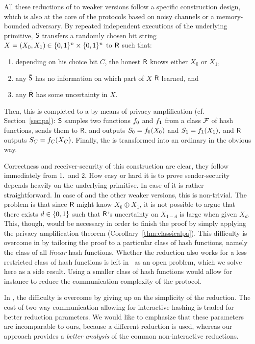 All these reductions of \OT to weaker versions follow a specific
construction design, which is also at the core of the \OT protocols
based on noisy channels or a memory-bounded adversary. By repeated
independent executions of the underlying primitive, $\S$ transfers a
randomly chosen bit string $X = (X_0,X_1) \in \set{0,1}^n \times
\set{0,1}^n$ to $\R$ such that: 
\vspace{-3mm}
\begin{enumerate} \addtolength{\itemsep}{-3mm} 
\item depending on his choice bit $C$, the honest $\R$ knows either
  $X_0$ or $X_1$,
\item any $\dS$ has no information on which part of $X$ $\R$ learned,
  and 
\item any $\dR$ has some uncertainty in $X$. 
\end{enumerate}

Then, this is completed to a \RandOT by means of privacy
amplification (cf. Section~\ref{sec:pa}): $\S$ samples two functions $\hf_0$ and
$\hf_1$ from a \univ class $\UH$ of hash functions, sends them to
$\R$, and outputs $S_0 = \hf_0(X_0)$ and $S_1 = \hf_1(X_1)$, and $\R$
outputs $S_C = \hf_C(X_C)$. Finally, the \RandOT is transformed into
an ordinary \OT in the obvious way.

Correctness and receiver-security of this construction are clear, they follow
immediately from 1.\ and 2. How easy or hard it is to prove
sender-security depends heavily on the underlying primitive. In case of
\RabinOT it is rather straightforward. In case of \XOT and the other
weaker versions, this is non-trivial. The problem is that since $\R$
might know $X_0 \oplus X_1$, it is not possible to argue that there
exists $d \in \set{0,1}$ such that $\R$'s uncertainty on $X_{1-d}$ is
large when given $X_d$. This, though, would be necessary in order to
finish the proof by simply applying the privacy amplification
theorem (Corollary~\ref{thm:classicalpa}). This difficulty is overcome in
\cite{BC97,BCW03} by tailoring the proof to a particular \univ class
of hash functions, namely the class of all {\em linear} hash
functions. Whether the reduction also works for a less restricted
class of hash functions is left in~\cite{BC97,BCW03} as an open
problem, which we solve here as a side result. Using a smaller class of hash functions would allow for instance to reduce the communication complexity of the protocol. 

In \cite{CS06}, the difficulty is overcome by giving up on the
simplicity of the reduction. The cost of two-way communication
allowing for interactive hashing is traded for better reduction
parameters. We would like to emphasize that these parameters are
incomparable to ours, because a different reduction is used, whereas
our approach provides a \emph{better analysis} of the common
non-interactive reductions.


